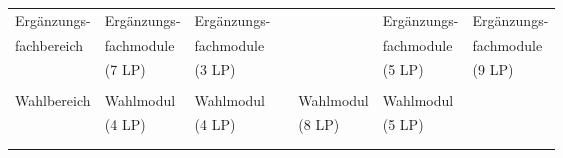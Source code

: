 \begin{center}
\begin{tabular}{||l||l|l|l|l|l|l||}
\hhline{|:=::======:|}
Ergänzungs-&Ergänzungs- &Ergänzungs-&&&Ergänzungs-&Ergänzungs-\\
\hhline{||~||~|~|~|~|~|~||} fachbereich&fachmodule&fachmodule&&&fachmodule&fachmodule\\
\hhline{||~||~|~|~|~|~|~||} &(7 LP)&(3 LP)&&&(5 LP)&(9 LP)\\
\hhline{||~||~|~|~|~|~|~||} &&&&&& \\
\hhline{|:=::======:|}
Wahlbereich&Wahlmodul&Wahlmodul&&Wahlmodul&Wahlmodul&\\
\hhline{||~||~|~|~|~|~|~||} &(4 LP)&(4 LP)&&(8 LP)&(5 LP)&\\
\hhline{||~||~|~|~|~|~|~||} &&&&&& \\
\hhline{|b:=:b:======:b|}
\end{tabular}
\end{center}

\clearpage
